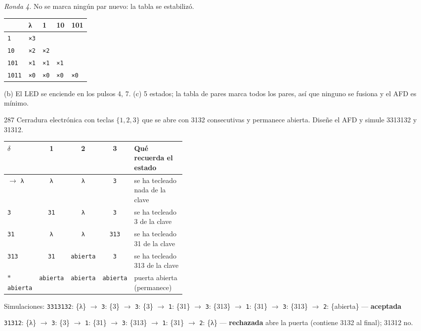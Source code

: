 \documentclass[11pt]{article}
\begin{document}
\textit{Ronda 4.} No se marca ningún par nuevo: la tabla se estabilizó.
\begin{center}\footnotesize\begin{tabular}{lllll}\toprule
 & λ & 1 & 10 & 101 \\\midrule
\texttt{1} & \texttt{×3} & \texttt{} & \texttt{} & \texttt{} \\
\texttt{10} & \texttt{×2} & \texttt{×2} & \texttt{} & \texttt{} \\
\texttt{101} & \texttt{×1} & \texttt{×1} & \texttt{×1} & \texttt{} \\
\texttt{1011} & \texttt{×0} & \texttt{×0} & \texttt{×0} & \texttt{×0} \\
\bottomrule\end{tabular}\end{center}

\resp (b) El LED se enciende en los pulsos 4, 7. (c) 5 estados; la tabla de pares marca todos los pares, así que ninguno se fusiona y el AFD es mínimo.


\begin{ejercicio}{287}{}
Cerradura electrónica con teclas $\{1, 2, 3\}$ que se abre con 3132 consecutivas y permanece abierta. Diseñe el AFD y simule 3313132 y 31312.
\end{ejercicio}
\proc \begin{center}\small\begin{tabular}{lcccp{0.42\linewidth}}\toprule
$\delta$ & 1 & 2 & 3 & Qué recuerda el estado \\\midrule
$\to$ \texttt{λ} & \texttt{λ} & \texttt{λ} & \texttt{3} & se ha tecleado nada de la clave \\
 \texttt{3} & \texttt{31} & \texttt{λ} & \texttt{3} & se ha tecleado 3 de la clave \\
 \texttt{31} & \texttt{λ} & \texttt{λ} & \texttt{313} & se ha tecleado 31 de la clave \\
 \texttt{313} & \texttt{31} & \texttt{abierta} & \texttt{3} & se ha tecleado 313 de la clave \\
$*$ \texttt{abierta} & \texttt{abierta} & \texttt{abierta} & \texttt{abierta} & puerta abierta (permanece) \\
\bottomrule\end{tabular}\end{center}
Simulaciones: \texttt{3313132}: \{λ\} $\to$ \texttt{3}: \{3\} $\to$ \texttt{3}: \{3\} $\to$ \texttt{1}: \{31\} $\to$ \texttt{3}: \{313\} $\to$ \texttt{1}: \{31\} $\to$ \texttt{3}: \{313\} $\to$ \texttt{2}: \{abierta\} — \textbf{aceptada}\par \texttt{31312}: \{λ\} $\to$ \texttt{3}: \{3\} $\to$ \texttt{1}: \{31\} $\to$ \texttt{3}: \{313\} $\to$ \texttt{1}: \{31\} $\to$ \texttt{2}: \{λ\} — \textbf{rechazada}
 abre la puerta (contiene 3132 al final); 31312 no.
\end{document}
